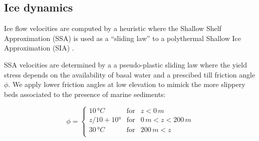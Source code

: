 \subsection{Ice dynamics}

Ice flow velocities are computed by a heuristic where the Shallow Shelf Approximation (SSA) is used as a ``sliding law'' to a polythermal Shallow Ice Approximation (SIA) \citep{bueler-brown-2009}. 


SSA velocities are determined by a a pseudo-plastic sliding law where the yield stress depends on the availability of basal water and a prescibed till friction angle$\phi$. We apply lower friction angles at low elevation to mimick the more slippery beds associated to the presence of marine sediments:

\begin{equation}
	\phi = \left\{\begin{array}{llc}
		10\,\unit{\degree C} & \mathrm{for} &               z<  0\,\unit{m} \\
		z/10 + 10°           & \mathrm{for} &   0\,\unit{m}<z<200\,\unit{m} \\
		30\,\unit{\degree C} & \mathrm{for} & 200\,\unit{m}<z               \\
	\end{array}\right.
\end{equation}

%
%
%
%

